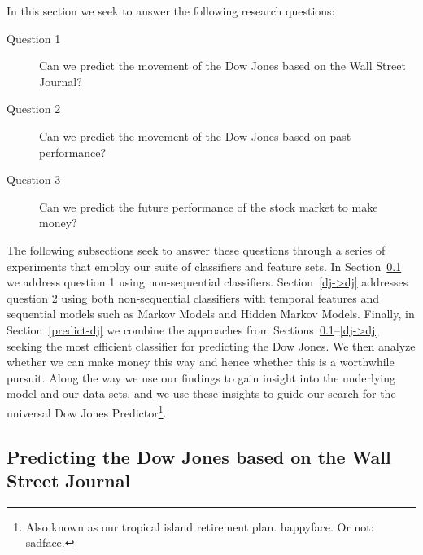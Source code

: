 \documentclass[10pt, twocolumn]{article}
\begin{document}
In this section we seek to answer the following research questions:
\begin{description}
\item[Question 1] Can we predict the movement of the Dow Jones based on the Wall Street Journal?
\item[Question 2] Can we predict the movement of the Dow Jones based on past performance?
\item[Question 3] Can we predict the future performance of the stock market to make money?
\end{description}

The following subsections seek to answer these questions through a series of experiments that employ our suite of classifiers and feature sets.
In Section~\ref{wsj->dj} we address question 1 using non-sequential classifiers.
Section~\ref{dj->dj} addresses question 2 using both non-sequential classifiers with temporal features and sequential models such as Markov Models and Hidden Markov Models.
Finally, in Section~\ref{predict-dj} we combine the approaches from Sections~\ref{wsj->dj}--\ref{dj->dj} seeking the most efficient classifier for predicting the Dow Jones.
We then analyze whether we can make money this way and hence whether this is a worthwhile pursuit. 
Along the way we use our findings to gain insight into the underlying model and our data sets, and we use these insights to guide our search for the universal Dow Jones Predictor\footnote{Also known as our tropical island retirement plan. happyface. Or not: sadface.}.


\subsection{Predicting the Dow Jones based on the Wall Street Journal}
\label{wsj->dj}
\end{document}
